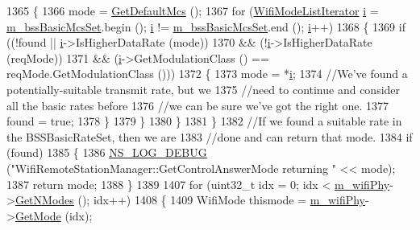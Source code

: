 \begin{DoxyCode}
1365         \{
1366           mode = \hyperlink{classns3_1_1WifiRemoteStationManager_ac088d1a4943d51a3fa0a9fbf42fdf961}{GetDefaultMcs} ();
1367           \textcolor{keywordflow}{for} (\hyperlink{namespacens3_a652d37bfd751d39eea327ca3402f6196}{WifiModeListIterator} \hyperlink{bernuolliDistribution_8m_a6f6ccfcf58b31cb6412107d9d5281426}{i} = \hyperlink{classns3_1_1WifiRemoteStationManager_a591e8d3c3d9216195a1ef7b513b4ad0c}{m\_bssBasicMcsSet}.begin (); 
      \hyperlink{bernuolliDistribution_8m_a6f6ccfcf58b31cb6412107d9d5281426}{i} != \hyperlink{classns3_1_1WifiRemoteStationManager_a591e8d3c3d9216195a1ef7b513b4ad0c}{m\_bssBasicMcsSet}.end (); \hyperlink{bernuolliDistribution_8m_a6f6ccfcf58b31cb6412107d9d5281426}{i}++)
1368             \{
1369               \textcolor{keywordflow}{if} ((!found || \hyperlink{bernuolliDistribution_8m_a6f6ccfcf58b31cb6412107d9d5281426}{i}->IsHigherDataRate (mode))
1370                   && (!\hyperlink{bernuolliDistribution_8m_a6f6ccfcf58b31cb6412107d9d5281426}{i}->IsHigherDataRate (reqMode))
1371                   && (\hyperlink{bernuolliDistribution_8m_a6f6ccfcf58b31cb6412107d9d5281426}{i}->GetModulationClass () == reqMode.GetModulationClass ()))
1372                 \{
1373                   mode = *\hyperlink{bernuolliDistribution_8m_a6f6ccfcf58b31cb6412107d9d5281426}{i};
1374                   \textcolor{comment}{//We've found a potentially-suitable transmit rate, but we}
1375                   \textcolor{comment}{//need to continue and consider all the basic rates before}
1376                   \textcolor{comment}{//we can be sure we've got the right one.}
1377                   found = \textcolor{keyword}{true};
1378                 \}
1379             \}
1380         \}
1381     \}
1382   \textcolor{comment}{//If we found a suitable rate in the BSSBasicRateSet, then we are}
1383   \textcolor{comment}{//done and can return that mode.}
1384   \textcolor{keywordflow}{if} (found)
1385     \{
1386       \hyperlink{group__logging_ga413f1886406d49f59a6a0a89b77b4d0a}{NS\_LOG\_DEBUG} (\textcolor{stringliteral}{"WifiRemoteStationManager::GetControlAnswerMode returning "} << mode);
1387       \textcolor{keywordflow}{return} mode;
1388     \}
1389 
1407   \textcolor{keywordflow}{for} (uint32\_t idx = 0; idx < \hyperlink{classns3_1_1WifiRemoteStationManager_a68cf308f39d3af06d148dae9268b9073}{m\_wifiPhy}->\hyperlink{classns3_1_1WifiPhy_a2467e56b69d64bb2d648302f39397317}{GetNModes} (); idx++)
1408     \{
1409       WifiMode thismode = \hyperlink{classns3_1_1WifiRemoteStationManager_a68cf308f39d3af06d148dae9268b9073}{m\_wifiPhy}->\hyperlink{classns3_1_1WifiPhy_ac35983a13a769a7fbaac43340b8cdaf2}{GetMode} (idx);

\end{DoxyCode}
